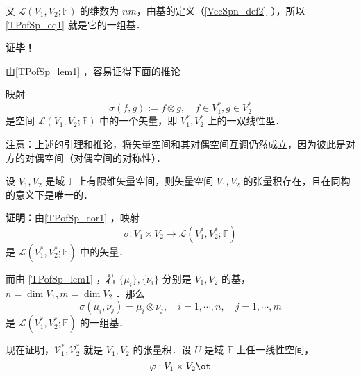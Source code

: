 又 $\mathcal L(V_1,V_2;\mathbb F)$ 的维数为 $nm$，由基的定义（\autoref{VecSpn_def2}~），所以\autoref{TPofSp_eq1} 就是它的一组基．

\textbf{证毕！}

由\autoref{TPofSp_lem1} ，容易证得下面的推论
\begin{corollary}{}\label{TPofSp_cor1}
映射
\begin{equation}
\sigma(f,g):=f\otimes g,\quad f\in V_1^*,g\in V_2^*
\end{equation}
是空间 $\mathcal L(V_1,V_2;\mathbb F)$ 中的一个矢量，即 $V_1^*,V_2^*$ 上的一双线性型．
\end{corollary}
注意：上述的引理和推论，将矢量空间和其对偶空间互调仍然成立，因为彼此是对方的对偶空间（对偶空间的对称性）．

\begin{theorem}{}
设 $V_1,V_2$ 是域 $\mathbb F$ 上有限维矢量空间，则矢量空间 $V_1,V_2$ 的张量积存在，且在同构的意义下是唯一的．
\end{theorem}
\textbf{证明：}由\autoref{TPofSp_cor1} ，映射 
\begin{equation}
\sigma:V_1\times V_2\rightarrow\mathcal L(V_1^*,V_2^*;\mathbb F) 
\end{equation}
是  $\mathcal L(V_1^*,V_2^*;\mathbb F)$ 中的矢量．

而由 \autoref{TPofSp_lem1} ，若 $\{\mu_i\},\{\nu_i\}$ 分别是 $V_1,V_2$ 的基，$n=\dim V_1,m=\dim V_2$ ．那么
\begin{equation}
\sigma(\mu_i,\nu_j)=\mu_i\otimes \nu_j,\quad i=1,\cdots,n,\quad j=1,\cdots,m
\end{equation}
是 $\mathcal L(V_1^*,V_2^*;\mathbb F)$ 的一组基．

现在证明，$\mathcal{V_1^*,V_2^*}$ 就是 $V_1,V_2$ 的张量积．设 $U$ 是域 $\mathbb F$ 上任一线性空间，
\begin{equation}
\varphi:V_1\times V_2\ot
\end{equation}


